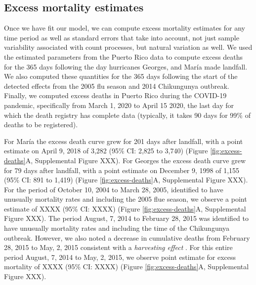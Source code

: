 \documentclass[11pt]{article}
\begin{document}
\subsection{Excess mortality estimates}
\label{subsec:excess-mortality}
Once we have fit our model, we can compute excess mortality estimates for any time period as well as standard errors that take into account, not just sample variability associated with count processes, but natural variation as well. We used the estimated parameters from the Puerto Rico data to compute excess deaths for the 365 days following the day hurricanes Georges, and Mar\'ia made landfall. We also computed these quantities for the 365 days following the start of the detected effects from the 2005 flu season and 2014 Chikungunya outbreak. Finally, we computed excess deaths in Puerto Rico during the COVID-19 pandemic, specifically from March 1, 2020 to April 15 2020, the last day for which the death registry has complete data (typically, it takes 90 days for 99\% of deaths to be registered). 

For Mar\'ia the excess death curve grew for 201 days after landfall, with a point estimate on April 9, 2018 of 3,282 (95\% CI: 2,825 to 3,740) (Figure \ref{fig:excess-deaths}A, Supplemental Figure XXX). For Georges the excess death curve grew for 79 days after landfall, with a point estimate on December 9, 1998 of 1,155 (95\% CI: 891 to 1,419)  (Figure \ref{fig:excess-deaths}A, Supplemental Figure XXX). For the period of October 10, 2004 to March 28, 2005, identified to have unusually mortality rates and including the 2005 flue season, we observe a point estimate of XXXX (95\% CI: XXXX)  (Figure \ref{fig:excess-deaths}A, Supplemental Figure XXX). The period August, 7, 2014 to February 28, 2015 was identified to have unusually mortality rates and including the time of the Chikungunya outbreak. However, we also noted a decrease in cumulative deaths from February 28, 2015 to May, 2, 2015 consistent with a \emph{harvesting effect} \cite{hajat2005mortality, dushoff2006mortality}. For this entire period August, 7, 2014 to May, 2, 2015, we observe point estimate for excess mortality of XXXX (95\% CI: XXXX)  (Figure \ref{fig:excess-deaths}A, Supplemental Figure XXX).
\end{document}
